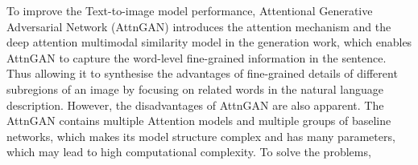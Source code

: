 \documentclass[runningheads, orivec]{llncs}
\begin{document}

To improve the Text-to-image model performance, Attentional Generative Adversarial Network (AttnGAN) introduces the attention mechanism and the deep attention multimodal similarity model in the generation work, which enables AttnGAN to capture the word-level fine-grained information in the sentence. Thus allowing it to synthesise the advantages of fine-grained details of different subregions of an image by focusing on related words in the natural language description. However, the disadvantages of AttnGAN are also apparent. The AttnGAN contains multiple Attention models and multiple groups of baseline networks, which makes its model structure complex and has many parameters, which may lead to high computational complexity. To solve the problems,
\end{document}
